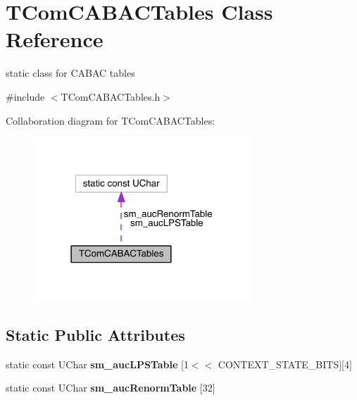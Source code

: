\hypertarget{class_t_com_c_a_b_a_c_tables}{}\section{T\+Com\+C\+A\+B\+A\+C\+Tables Class Reference}
\label{class_t_com_c_a_b_a_c_tables}


static class for C\+A\+B\+AC tables  




{\ttfamily \#include $<$T\+Com\+C\+A\+B\+A\+C\+Tables.\+h$>$}



Collaboration diagram for T\+Com\+C\+A\+B\+A\+C\+Tables\+:
\nopagebreak
\begin{figure}[H]
\begin{center}
\leavevmode
\includegraphics[width=231pt]{d1/dd1/class_t_com_c_a_b_a_c_tables__coll__graph}
\end{center}
\end{figure}
\subsection*{Static Public Attributes}
{\bf }\par
\begin{DoxyCompactItemize}
\item 
\mbox{\label{class_t_com_c_a_b_a_c_tables_a7983c4b645ef4f52ff146063ab066de6}} 
static const U\+Char {\bfseries sm\+\_\+auc\+L\+P\+S\+Table} \mbox{[}1$<$$<$ C\+O\+N\+T\+E\+X\+T\+\_\+\+S\+T\+A\+T\+E\+\_\+\+B\+I\+TS\mbox{]}\mbox{[}4\mbox{]}
\item 
static const U\+Char {\bfseries sm\+\_\+auc\+Renorm\+Table} \mbox{[}32\mbox{]}
\end{DoxyCompactItemize}



